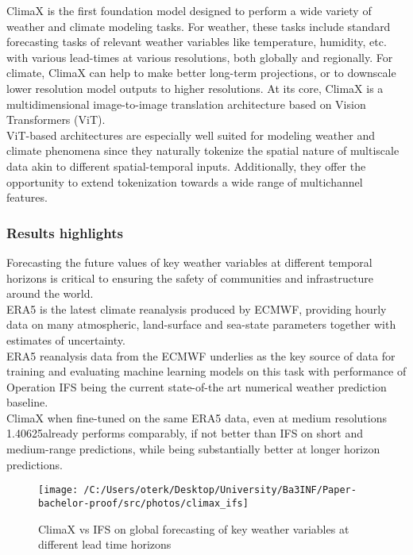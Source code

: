 \documentclass[../paper.tex]{subfiles}
\begin{document}
    ClimaX is the first foundation model designed to perform a wide variety of weather and climate modeling tasks.
    For weather, these tasks include standard forecasting tasks of relevant weather variables like temperature,
    humidity, etc.
    with various lead-times at various resolutions, both globally and regionally.
    For climate, ClimaX can help to make better long-term projections,
    or to downscale lower resolution model outputs to higher resolutions.
    At its core, ClimaX is a multidimensional image-to-image translation architecture based on Vision Transformers
    (ViT).\\
    ViT-based architectures are especially well suited for modeling weather and climate phenomena
    since they naturally tokenize the spatial nature of multiscale data akin to different spatial-temporal inputs.
    Additionally,
    they offer the opportunity to extend tokenization towards a wide range of multichannel features.\cite{d1}
    \subsubsection{Results highlights}
        Forecasting the future values of key weather variables at different temporal horizons is critical
        to ensuring the safety of communities and infrastructure around the world.\\
        ERA5 is the latest climate reanalysis produced by ECMWF,
        providing hourly data on many atmospheric,
        land-surface and sea-state parameters together with estimates of uncertainty.\cite{d2} \\
        ERA5 reanalysis data from the ECMWF underlies as the key source of data for training
        and evaluating machine learning models on this task with performance of Operation
        IFS being the current state-of-the art numerical weather prediction baseline.\\
        ClimaX when fine-tuned on the same ERA5 data,
        even at medium resolutions 1.40625\textdegree already performs comparably,
        if not better than IFS on short and medium-range predictions,
        while being substantially better at longer horizon predictions.\cite{d1}
        \begin{figure}[htbp]
        \centerline{\texttt{[image: /C:/Users/oterk/Desktop/University/Ba3INF/Paper-bachelor-proof/src/photos/climax\_ifs]}}
        \caption{ClimaX vs IFS on global forecasting of key weather variables at different lead time horizons}
        \label{fig:climax-vs-ifs}
        \end{figure}
\end{document}
